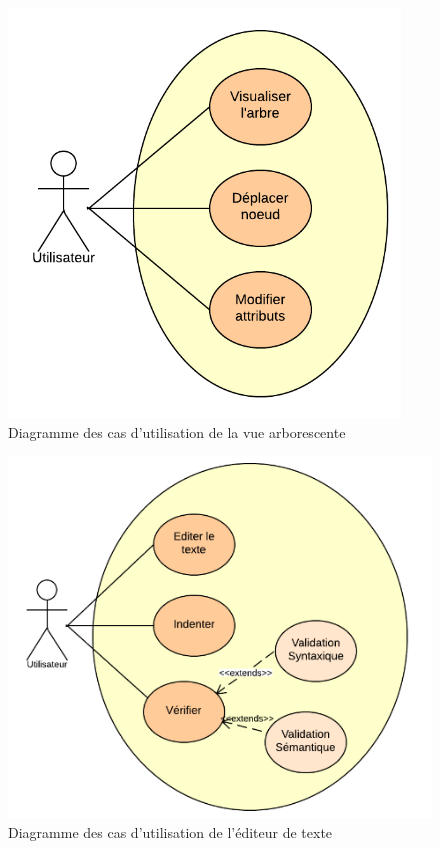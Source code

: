 \begin{figure}[h!]
\begin{minipage}[b]{\linewidth}
\centering \includegraphics[scale=0.5]{images/analyse-diag-arbo.png}
\caption{Diagramme des cas d'utilisation de la vue arborescente}
\label{diagarbo}
\end{minipage}
\end{figure}

\begin{figure}[h!]
\begin{minipage}[b]{\linewidth}
\centering \includegraphics[scale=0.5]{images/analyse-diag-editeur.png}
\caption{Diagramme des cas d'utilisation de l'éditeur de texte}
\label{diagediteur}
\end{minipage}
\end{figure}

